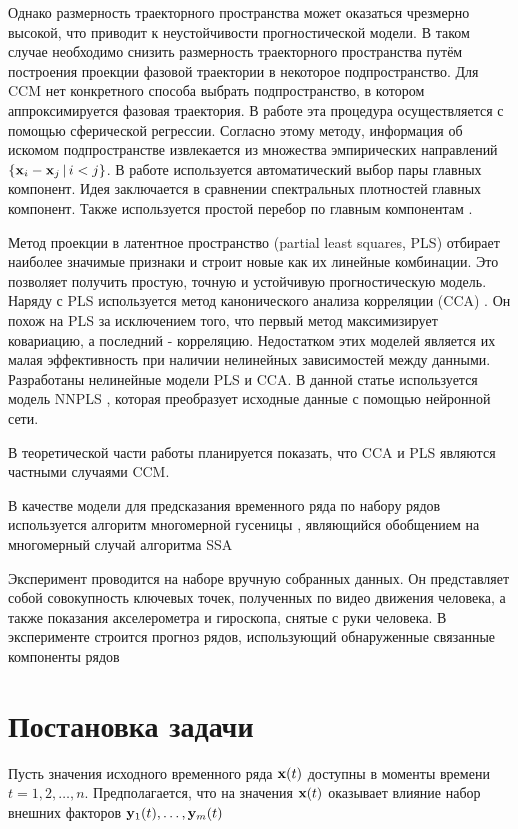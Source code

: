 \documentclass[a4paper]{article}
\begin{document}
Однако размерность траекторного пространства может оказаться чрезмерно высокой, что приводит к неустойчивости прогностической модели.
В таком случае необходимо снизить размерность траекторного пространства путём построения проекции фазовой траектории в некоторое подпространство. Для CCM нет конкретного способа выбрать подпространство, в котором аппроксимируется фазовая траектория.
В работе \citep{usmanova2020sphere_regr} эта процедура осуществляется с помощью сферической регрессии. Согласно этому методу, информация об искомом подпространстве извлекается из множества эмпирических направлений $\{ \mathbf{x}_i - \mathbf{x}_j\, | \, i < j \}$.
В работе \citep{alexandrov2005automatic} используется автоматический выбор пары главных компонент. Идея заключается в сравнении спектральных плотностей главных компонент. Также используется простой перебор по главным компонентам \citep{usmanova2019dependencies}.

Метод проекции в латентное пространство (partial least squares, PLS) \citep{rosipal2011nonlinear, rosipal2005overview} отбирает наиболее значимые признаки и строит новые как их линейные комбинации. 
Это позволяет получить простую, точную и устойчивую прогностическую модель.
Наряду с PLS используется метод канонического анализа корреляции (CCA) \citep{hardoon2004canonical}. 
Он похож на PLS за исключением того, что первый метод максимизирует ковариацию, а последний - корреляцию. 
Недостатком этих моделей является их малая эффективность при наличии нелинейных зависимостей между данными.
Разработаны нелинейные модели PLS\citep{qin1992nonlinear, hiden1998non} и CCA\citep{lai2000kernel, andrew2013deep}.
В данной статье используется модель NNPLS \citep{bulut2014new}, которая преобразует исходные данные с помощью нейронной сети. 

В теоретической части работы планируется показать, что CCA и PLS являются частными случаями CCM.

В качестве модели для предсказания временного ряда по набору рядов используется алгоритм многомерной гусеницы \citep{golyandina2005ssa}, являющийся
обобщением на многомерный случай алгоритма SSA

Эксперимент проводится на наборе вручную собранных данных. Он представляет собой совокупность ключевых точек, полученных 
по видео движения человека, а также показания акселерометра и гироскопа, снятые с руки человека. 
В эксперименте строится прогноз рядов, использующий обнаруженные связанные компоненты рядов

\section{Постановка задачи}
Пусть значения исходного временного ряда $\mathbf{x}(t)$ доступны в  моменты времени $t = 1, 2, \ldots, n$. Предполагается, что на значения $\mathbf{x}(t)$ оказывает влияние набор внешних факторов $\mathbf{y}_1(t), \ldots, \mathbf{y}_m(t)$
\end{document}
